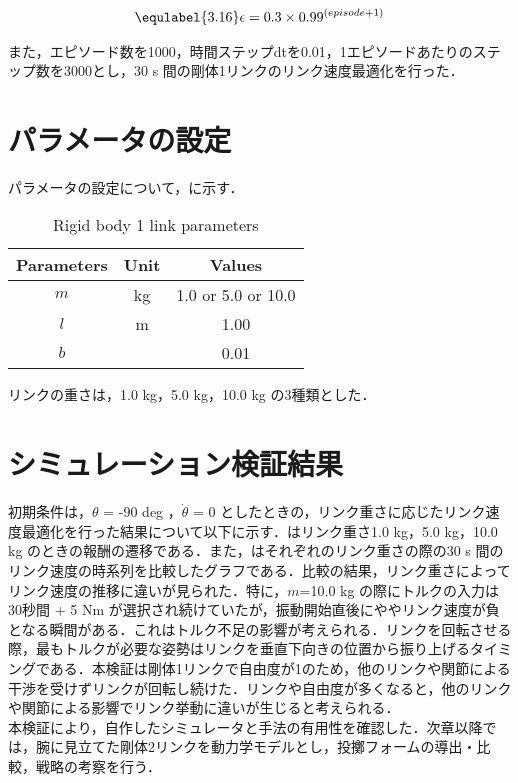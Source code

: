 \begin{eqnarray}
  \equlabel{3.16}
  \epsilon = 0.3 \times 0.99^{(episode + 1)}
\end{eqnarray}

また，エピソード数を1000，時間ステップdtを0.01，1エピソードあたりのステップ数を3000とし，30 s 間の剛体1リンクのリンク速度最適化を行った．
\section{パラメータの設定}
パラメータの設定について，に示す．
\begin{table}[tb]
  \begin{center}
    \caption{Rigid body 1 link parameters}
    \begin{tabular}{c|c|c}
      \hline
      Parameters & Unit & Values \\
      \hline
      $m$ & kg & 1.0 or 5.0 or 10.0\\
      $l$ & m & 1.00 \\
      $b$ &  & 0.01 \\
      \hline
    \end{tabular}
  \end{center}
\end{table}
リンクの重さは，1.0 kg，5.0 kg，10.0 kg の3種類とした．
\section{シミュレーション検証結果}
初期条件は，$\theta$ = -90 deg ，$\dot{\theta}$ = 0 としたときの，リンク重さに応じたリンク速度最適化を行った結果について以下に示す．はリンク重さ1.0 kg，5.0 kg，10.0 kg のときの報酬の遷移である．また，はそれぞれのリンク重さの際の30 s 間のリンク速度の時系列を比較したグラフである．比較の結果，リンク重さによってリンク速度の推移に違いが見られた．特に，$m$=10.0 kg の際にトルクの入力は30秒間 + 5 Nm が選択され続けていたが，振動開始直後にややリンク速度が負となる瞬間がある．これはトルク不足の影響が考えられる．リンクを回転させる際，最もトルクが必要な姿勢はリンクを垂直下向きの位置から振り上げるタイミングである．本検証は剛体1リンクで自由度が1のため，他のリンクや関節による干渉を受けずリンクが回転し続けた．リンクや自由度が多くなると，他のリンクや関節による影響でリンク挙動に違いが生じると考えられる．\\
本検証により，自作したシミュレータと手法の有用性を確認した．次章以降では，腕に見立てた剛体2リンクを動力学モデルとし，投擲フォームの導出・比較，戦略の考察を行う．

